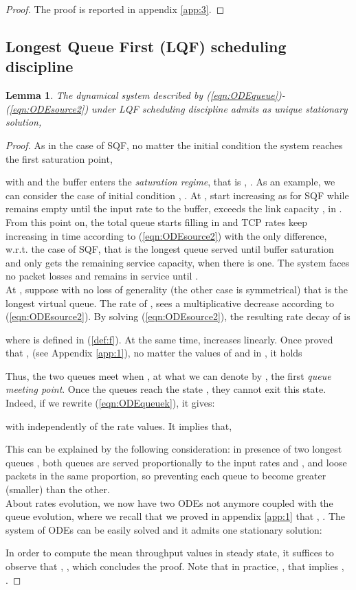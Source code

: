 \documentclass[a4paper,oneside, 11pt]{article}
\newtheorem{lem}[theorem]{Lemma}
\begin{document}
\begin{proof}
The proof is reported in appendix \ref{app:3}.
\end{proof}
\subsection{Longest Queue First (LQF) scheduling discipline}\label{sec:LQF}
\begin{lem}
 The dynamical system described by (\ref{eqn:ODEqueue})-(\ref{eqn:ODEsource2}) under LQF scheduling discipline admits as unique stationary solution,

\end{lem}
\begin{proof}
As in the case of SQF, no matter the initial condition the system reaches the first saturation point,

with  and the buffer enters the \textit{saturation regime}, that is , .
As an example, we can consider the case of initial condition , .
At ,  start increasing as for SQF while  remains empty
until the input rate to the buffer, 
exceeds the link capacity , in .
From this point on, the total queue starts filling in and TCP rates keep increasing in time according to (\ref{eqn:ODEsource2}) with the only difference, w.r.t. the case of SQF, that
 is the longest queue served until buffer saturation and  only gets the remaining service capacity, when there is one.
The system faces no packet losses and  remains in service until  .\\
At ,
suppose with no loss of generality (the other case is symmetrical) that  is the longest virtual queue. The rate of ,  sees a multiplicative decrease according to (\ref{eqn:ODEsource2}).
By solving (\ref{eqn:ODEsource2}), the resulting rate decay of  is 

where  is defined in (\ref{def:f}).
At the same time,  increases linearly.
Once proved that ,  (see Appendix \ref{app:1}), no matter the values of  and  in , it holds

Thus, the two queues meet when , at
what we can denote by , the first \textit{queue meeting point}.
Once the queues reach the state , they cannot exit this state. Indeed, if we rewrite (\ref{eqn:ODEqueuek}), it gives:

with  independently of the rate values.
It implies that,

This can be explained by the following consideration: in presence of two longest queues , both queues are served proportionally
to the input rates  and , and loose packets in the same proportion, so preventing each queue to become greater (smaller) than the other.\\
About rates evolution, we now have two ODEs not anymore coupled with the queue evolution,
where we recall that we proved in appendix \ref{app:1} that , .
The system of ODEs can be easily solved and it admits one stationary solution:

In order to compute the mean throughput values in steady state, it suffices to observe
that , ,
which concludes the proof. Note that in practice, , that implies , .
\end{proof}
\end{document}
